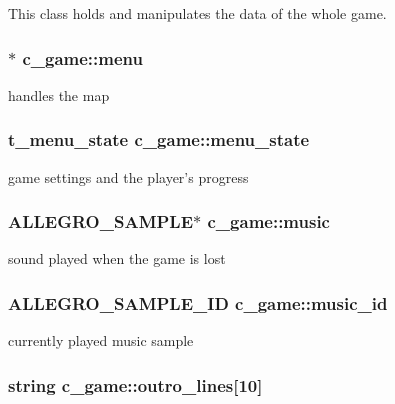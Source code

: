 This class holds and manipulates the data of the whole game. \hypertarget{classc__game_ad4535e427b20e3fe386a0add7fa68afa}{
\subsubsection[{menu}]{$\ast$ c\-\_\-game\-::menu\hspace{0.3cm}{\ttfamily [protected]}}}\label{classc__game_ad4535e427b20e3fe386a0add7fa68afa}
handles the map \hypertarget{classc__game_a2d4311ca959ebad56e79e0162cf7a9c0}{
\subsubsection[{menu\-\_\-state}]{\setlength{\rightskip}{0pt plus 5cm}t\-\_\-menu\-\_\-state c\-\_\-game\-::menu\-\_\-state\hspace{0.3cm}{\ttfamily [protected]}}}\label{classc__game_a2d4311ca959ebad56e79e0162cf7a9c0}
game settings and the player's progress \hypertarget{classc__game_aa242357f3a3062813163d6e088958760}{
\subsubsection[{music}]{\setlength{\rightskip}{0pt plus 5cm}A\-L\-L\-E\-G\-R\-O\-\_\-\-S\-A\-M\-P\-L\-E$\ast$ c\-\_\-game\-::music\hspace{0.3cm}{\ttfamily [protected]}}}\label{classc__game_aa242357f3a3062813163d6e088958760}
sound played when the game is lost \hypertarget{classc__game_af5caa082e80f20d7def128c6f7c9469d}{
\subsubsection[{music\-\_\-id}]{\setlength{\rightskip}{0pt plus 5cm}A\-L\-L\-E\-G\-R\-O\-\_\-\-S\-A\-M\-P\-L\-E\-\_\-\-I\-D c\-\_\-game\-::music\-\_\-id\hspace{0.3cm}{\ttfamily [protected]}}}\label{classc__game_af5caa082e80f20d7def128c6f7c9469d}
currently played music sample \hypertarget{classc__game_ab1a47c45fe34e4a5f6287d4c91d1740b}{
\subsubsection[{outro\-\_\-lines}]{\setlength{\rightskip}{0pt plus 5cm}string c\-\_\-game\-::outro\-\_\-lines\mbox{[}10\mbox{]}\hspace{0.3cm}{\ttfamily [protected]}}}\label{classc__game_ab1a47c45fe34e4a5f6287d4c91d1740b}

